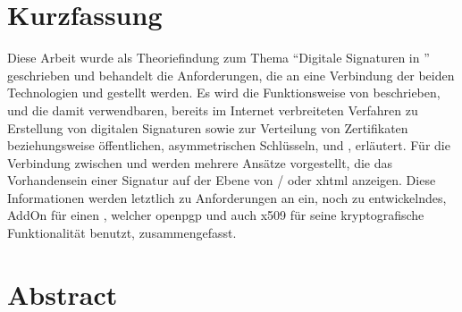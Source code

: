 

\noindent
\begin{minipage}{\textwidth}
\chapter*{Kurzfassung}
Diese Arbeit wurde als Theoriefindung zum Thema ``Digitale Signaturen in '' geschrieben und behandelt die Anforderungen, die an eine Verbindung
der beiden Technologien  und  gestellt werden. Es wird die Funktionsweise von  beschrieben, und die damit
verwendbaren, bereits im Internet verbreiteten Verfahren zu Erstellung von digitalen Signaturen sowie zur Verteilung von Zertifikaten beziehungsweise
öffentlichen, asymmetrischen Schlüsseln,  und , erläutert. Für die Verbindung zwischen  und
 werden mehrere Ansätze vorgestellt, die das Vorhandensein einer Signatur auf der Ebene von / oder \gls{xhtml}
anzeigen. Diese Informationen werden letztlich zu Anforderungen an ein, noch zu entwickelndes, AddOn für einen , welcher \gls{openpgp} und
auch \gls{x509} für seine kryptografische Funktionalität benutzt, zusammengefasst.

\chapter*{Abstract}
\blindtext

\end{minipage}
